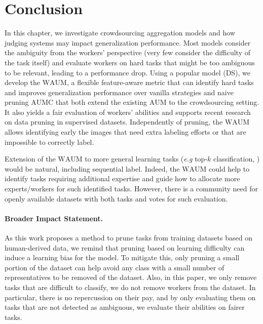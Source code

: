 \section{Conclusion}
In this chapter, we investigate crowdsourcing aggregation models and how judging systems may impact generalization performance.
Most models consider the ambiguity from the workers' perspective (very few consider the difficulty of the task itself) and evaluate workers on hard tasks that might be too ambiguous to be relevant, leading to a performance drop.
Using a popular model (DS), we develop the $\mathrm{WAUM}$, a flexible feature-aware metric that can identify hard tasks and improves generalization performance over vanilla strategies and naive pruning $\mathrm{AUMC}$ that both extend the existing $\mathrm{AUM}$ to the crowdsourcing setting.
It also yields a fair evaluation of workers' abilities and supports recent research on data pruning in supervised datasets.
Independently of pruning, the $\mathrm{WAUM}$ allows identifying early the images that need extra labeling efforts or that are impossible to correctly label.

Extension of the $\mathrm{WAUM}$ to more general learning tasks (\emph{e.g} top-$k$ classification, ) would be natural, including sequential label.
Indeed, the $\mathrm{WAUM}$ could help to identify tasks requiring additional expertise and guide how to allocate more experts/workers for such identified tasks. However, there is a community need for openly available datasets with both tasks and votes for such evaluation.

\paragraph*{Broader Impact Statement.}
As this work proposes a method to prune tasks from training datasets based on human-derived data, we remind that pruning based on learning difficulty can induce a learning bias for the model.
To mitigate this, only pruning a small portion of the dataset can help avoid any class with a small number of representatives to be removed of the dataset.
Also, in this paper, we only remove tasks that are difficult to classify, we do not remove workers from the dataset.
In particular, there is no repercussion on their pay, and by only evaluating them on tasks that are not detected as ambiguous, we evaluate their abilities on fairer tasks.
